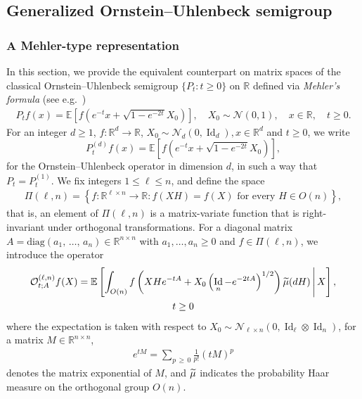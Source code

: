 \documentclass[AHL,Unicode,longabstracts,published]{cedram}
\DeclareMathOperator{\Id}{Id}
\newcommand{\scN}{\mathscr{N}}
\newcommand{\diag}{\mathrm{diag}}
\newcommand{\clO}{\mathcal{O}}
\newcommand{\R}{\mathbb{R}}
\newcommand{\E}[1]{\mathbb{E}\left[#1\right]}
\let\oldtilde\tilde
\renewcommand*{\tilde}[1]{\mathchoice{\widetilde{#1}}{\widetilde{#1}}{\oldtilde{#1}}{\oldtilde{#1}}}
\begin{document}
\subsection{Generalized Ornstein--Uhlenbeck semigroup}\label{SecOrtho}
\subsubsection{A Mehler-type representation}
In this section, we provide the equivalent counterpart on matrix spaces of the classical Ornstein--Uhlenbeck semigroup $\{P_t:t\geq 0\}$ on $\R$ defined via \emph{Mehler's formula} (see e.g.~\cite[Theorem~2.8.2]{NP12})
\begin{gather*}\label{Mehler}
P_tf(x) = \E{f\left(e^{-t}x+\sqrt{1-e^{-2t}}X_0\right)}, \quad X_0 \sim \scN(0,1), \quad x \in \R,\quad t\geq0.
\end{gather*}
For an integer $d\geq 1$, $f:\R^d \to \R$, $ X_0 \sim \scN_d(0, \Id_d), x \in \R^d$ and $ t\geq 0$, we write
\begin{equation}\label{Eq:Ptd}
P_t^{(d)} f(x) = \E{f\left(e^{-t}x+\sqrt{1-e^{-2t}}X_0\right)},
\end{equation}
for the Ornstein--Uhlenbeck operator in dimension $d$, in such a way that $P_t=P_t^{(1)}$. We fix integers $1\leq \ell\leq n$, and define the space
\begin{gather}\label{Piln}
\Pi(\ell,n)= \left\{ f: \R^{\ell \times n}\to \R: f(XH)=f(X) \textrm{ for every } H \in O(n)\right\},
\end{gather}
that is, an element of $\Pi(\ell,n)$ is a matrix-variate function that is right-invariant under orthogonal transformations. For a diagonal matrix $A=\diag(a_1,\,\ldots,\,a_n)\in \R^{n\times n}$ with $a_1,\ldots,a_n \geq 0$ and $f\in\Pi(\ell,n)$, we introduce the operator
\begin{multline}\label{OU}
\clO_{t;A}^{(\ell,n)}f(X) = \E{ \int_{O(n)} f\left(XHe^{-tA}+X_0\left(\Id_n-e^{-2tA}\right)^{1/2}\right) \tilde{\mu}(dH)\,\middle|\,X}, \\ t\geq0
\end{multline}
where the expectation is taken with respect to $X_0 \sim \scN_{\ell\times n}(0,\Id_{\ell}\otimes \Id_n)$, for a matrix $M \in \R^{n\times n}$,
\begin{gather*}
e^{tM} = \sum_{p\,\geq\,0} \frac{1}{p!}(tM)^p
\end{gather*}
denotes the matrix exponential of $M$, and $\tilde{\mu}$ indicates the probability Haar measure on the orthogonal group $O(n)$.
\end{document}
